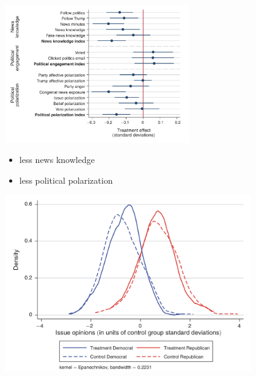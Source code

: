 \documentclass[aspectratio=169]{beamer}
\begin{document}
\begin{frame}

\begin{center}
\includegraphics[width=0.6\textwidth]{figures/allcott_welfare_2020_fig3}
\end{center}

\begin{itemize}
\item less news knowledge \pause
\item less political polarization
\end{itemize}

\end{frame}
\begin{frame}

\begin{center}
\includegraphics[width=0.8\textwidth]{figures/allcott_welfare_2020_fig4}
\end{center}

\end{frame}
\end{document}
